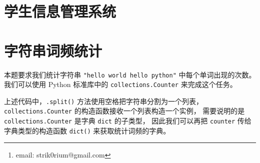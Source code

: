 \documentclass[openany, 10pt]{ctexart}
\title{\thetitle}
\author{Strik0r
\thanks{email: strik0rium@gmail.com}}
\begin{document}


\newpage
{\small \setlength{\parskip}{0em} \tableofcontents}

\section{学生信息管理系统}
    
\section{字符串词频统计}
    
    本题要求我们统计字符串 \lstinline|"hello world hello python"| 中每个单词出现的次数。
    我们可以使用 Python 标准库中的 \lstinline|collections.Counter| 来完成这个任务。
    

    上述代码中，\lstinline|.split()| 方法使用空格把字符串分割为一个列表，
    \lstinline|collections.Counter| 的构造函数接收一个列表构造一个实例，
    需要说明的是 \lstinline|collections.Counter| 是字典 \lstinline|dict| 的子类型，
    因此我们可以再把 \lstinline|counter| 传给字典类型的构造函数 \lstinline|dict()| 来获取统计词频的字典。
\end{document}
